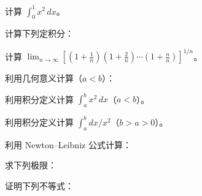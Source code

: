 \noindent\begin{minipage}{\textwidth}
计算 $\int_0^1 x^2\,dx$。
\end{minipage}\par\vfill
\noindent\begin{minipage}{\textwidth}
计算下列定积分：
\end{minipage}\par\vfill
\newpage
\noindent\begin{minipage}{\textwidth}
计算 $\displaystyle\lim_{n\to\infty}\left[\left(1+\frac1n\right)\left(1+\frac2n\right)\cdots\left(1+\frac nn\right)\right]^{1/n}$。
\end{minipage}\par\vfill
\noindent\begin{minipage}{\textwidth}
利用几何意义计算（$a<b$）：
\end{minipage}\par\vfill
\noindent\begin{minipage}{\textwidth}
利用积分定义计算 $\int_a^b x^2\,dx$（$a<b$）。
\end{minipage}\par\vfill
\newpage
\noindent\begin{minipage}{\textwidth}
利用积分定义计算 $\int_a^b dx/x^2$（$b>a>0$）。
\end{minipage}\par\vfill
\noindent\begin{minipage}{\textwidth}
利用 Newton--Leibniz 公式计算：
\end{minipage}\par\vfill
\noindent\begin{minipage}{\textwidth}
求下列极限：
\end{minipage}\par\vfill
\newpage
\noindent\begin{minipage}{\textwidth}
证明下列不等式：
\end{minipage}\par\vfill
